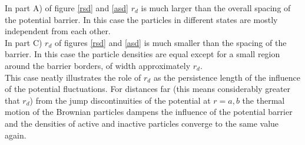 In part A) of figure \ref{rsd} and \ref{asd} $r_d$ is much larger than the overall spacing of the potential barrier. In this case the particles in different states are mostly independent from each other. \\
In part C) $r_d$ of figures \ref{rsd} and \ref{asd} is much smaller than the spacing of the barrier. In this case the particle densities are equal except for a small region around the barrier borders, of width approximately $r_d$.\\ 
This case neatly illustrates the role of $r_d$ as the persistence length of the influence of the potential fluctuations. For distances far (this means considerably greater that $r_d$) from the jump discontinuities of the potential at  $r=a,b$ the thermal motion of the Brownian particles dampens the influence of the potential barrier and the densities of active and inactive particles converge to the same value again.\\

\newpage



